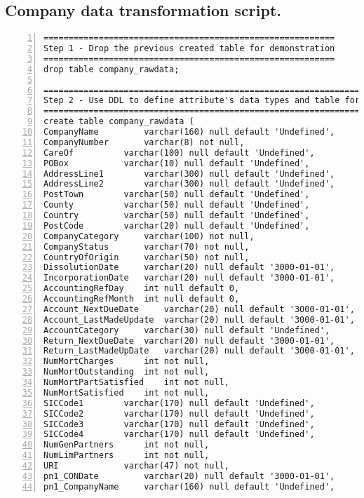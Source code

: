 \subsection{Company data transformation script.}
\lstset{basicstyle=\ttfamily\tiny}  
\begin{lstlisting}[breaklines, frame=single, numbers=left, caption={PL/pgSQL's scripts for Company data transformation.}, label=commandline-02]
==========================================================
Step 1 - Drop the previous created table for demonstration
==========================================================
drop table company_rawdata; 

===========================================================================================
Step 2 - Use DDL to define attribute's data types and table for data transformation purpose
===========================================================================================
create table company_rawdata ( 
CompanyName 		varchar(160) null default 'Undefined', 
CompanyNumber 		varchar(8) not null,
CareOf 			varchar(100) null default 'Undefined', 
POBox 			varchar(10) null default 'Undefined',
AddressLine1 		varchar(300) null default 'Undefined',
AddressLine2 		varchar(300) null default 'Undefined',
PostTown 		varchar(50) null default 'Undefined',
County 			varchar(50) null default 'Undefined',
Country 		varchar(50) null default 'Undefined',
PostCode 		varchar(20) null default 'Undefined',
CompanyCategory 	varchar(100) not null,
CompanyStatus 		varchar(70) not null,
CountryOfOrigin 	varchar(50) not null,
DissolutionDate 	varchar(20) null default '3000-01-01',
IncorporationDate 	varchar(20) null default '3000-01-01',
AccountingRefDay 	int null default 0,
AccountingRefMonth 	int null default 0,
Account_NextDueDate 	varchar(20) null default '3000-01-01',
Account_LastMadeUpdate 	varchar(20) null default '3000-01-01',
AccountCategory 	varchar(30) null default 'Undefined',
Return_NextDueDate 	varchar(20) null default '3000-01-01',
Return_LastMadeUpDate 	varchar(20) null default '3000-01-01',
NumMortCharges 		int not null,
NumMortOutstanding 	int not null,
NumMortPartSatisfied	int not null,
NumMortSatisfied 	int not null,
SICCode1 		varchar(170) null default 'Undefined',
SICCode2 		varchar(170) null default 'Undefined',
SICCode3 		varchar(170) null default 'Undefined',
SICCode4 		varchar(170) null default 'Undefined',
NumGenPartners 		int not null,
NumLimPartners 		int not null,
URI 			varchar(47) not null,
pn1_CONDate 		varchar(20) null default '3000-01-01',
pn1_CompanyName 	varchar(160) null default 'Undefined',

\end{lstlisting}
